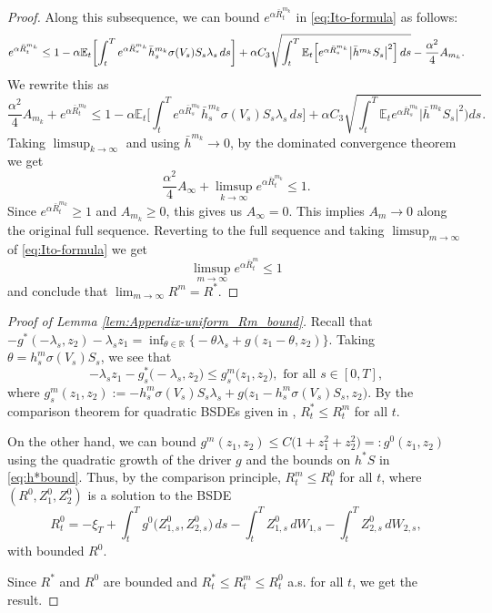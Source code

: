 \documentclass{article}
\newcommand{\R}{\mathbb{R}}
\newcommand{\E}{\mathbb{E}}
\def\bRm{\bar{R}^m}
\begin{document}
\begin{proof}
Along this subsequence, we can bound $e^{\alpha \bar{R}^{m_k}_t}$ in \eqref{eq:Ito-formula} as follows:
\[
	e^{\alpha \bar{R}^{m_k}_t}\leq 1 - \alpha \E_t\biggl[\int_t^T e^{\alpha \bar{R}^{m_k}_s}\bar{h}^{m_k}_s\sigma(V_s)S_s\lambda_s \, ds\biggr]+\alpha C_3 \sqrt{\int_t^T \E_t \Bigl[e^{\alpha \bar{R}^{m_k}_s}\bigl\vert\bar{h}^{m_k} S_s\bigr\vert^2\Bigr] \,ds} - \frac{\alpha^2}{4} A_{m_k}.
\]
We rewrite this  as
 \[
 	\frac{\alpha^2}{4} A_{m_k}+e^{\alpha \bar{R}^{m_k}_t}\leq 1 - \alpha \E_t\biggl[\int_t^T e^{\alpha \bar{R}^{m_k}_s}\bar{h}^{m_k}_s\sigma(V_s)S_s\lambda_s \, ds\biggr]+\alpha C_3 \sqrt{\int_t^T\E_t e^{\alpha \bar{R}^{m_k}_s} \bigl\vert \bar{h}^{m_k} S_s \bigr\vert^2)ds}.
 \]
 Taking $\limsup_{k\to\infty}$ and using $\bar{h}^{m_k}\to0$, by the dominated convergence theorem we get
 \[
 	\frac{\alpha^2}{4} A_\infty+\limsup_{k\to\infty}e^{\alpha \bar{R}^{m_k}_t} \leq 1.
\]
Since $e^{\alpha \bar{R}^{m_k}_t}\geq 1$ and $A_{m_k}\geq 0$, this gives us $A_\infty=0$. This implies $A_m\to 0$ along the original full sequence. Reverting to the full sequence and taking $\limsup_{m\to\infty}$ of \eqref{eq:Ito-formula} we get
\[
	\limsup_{m\to\infty} e^{\alpha \bRm_t} \leq 1
\] and conclude that $\lim_{m\to \infty} R^m = R^*$.
\end{proof}


\begin{proof}[Proof of Lemma \ref{lem:Appendix-uniform_Rm_bound}]
Recall that  $- g^*(-\lambda_s, z_2)-\lambda_s z_1 = \inf_{\theta\in \R}\bigl\{-\theta\lambda_s+g( z_1-\theta, z_2)\bigr\}$. Taking $\theta= h^m_s\sigma(V_s)S_s$, we see that
\[
	-\lambda_s z_1-g^*_s \bigl(-\lambda_s, z_2\bigr) \leq g^m_s\bigl(z_1, z_2\bigr), \text{ for all } s\in [0,T],
\]
where $g^m_s(z_1, z_2):= -h^m_s\sigma(V_s)S_s\lambda_s+ g\bigl(z_1-h^m_s\sigma(V_s)S_s, z_2\bigr)$. By the comparison theorem for quadratic BSDEs given in \cite[Theorem 5]{BH08}, 
$R^*_t \leq R^m_t$ for all $t$.  

On the other hand, we can bound $g^m(z_1,z_2) \leq C\bigl(1+z_1^2+z_2^2\bigr) = : g^0(z_1, z_2)$ using the quadratic growth of the driver $g$ and the bounds on $h^*S$ in \eqref{eq:h*bound}. Thus, by the comparison principle, $R_t^m\leq R_t^0$ for all $t$, where $(R^0, Z_1^0, Z_2^0)$ is a solution to the BSDE
\[
	R_t^0= -\xi_T+\int_t^Tg^0\bigl(Z_{1,s}^0, Z_{2,s}^0\bigr) \, ds - \int_t^T Z^0_{1,s} \, dW_{1,s} - \int_t^T Z^0_{2,s} \, dW_{2,s},
\]
with bounded $R^0$.

Since $R^*$ and $R^0$ are bounded and $R_t^*\leq R^m_t\leq R^0_t$ a.s. for all $t$, we get the result.
\end{proof}
\end{document}
